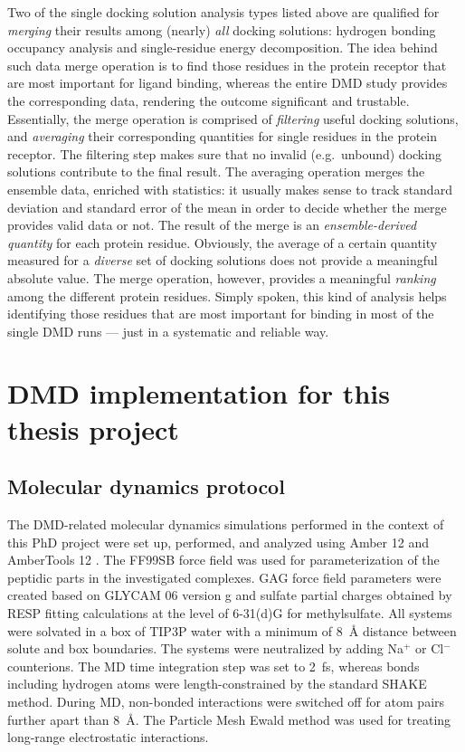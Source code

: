 Two of the single docking solution analysis types listed above are qualified for
\textit{merging} their results among (nearly) \textit{all} docking solutions:
hydrogen bonding occupancy analysis and single-residue energy decomposition. The
idea behind such data merge operation is to find those residues in the protein
receptor that are most important for ligand binding, whereas the entire DMD
study provides the corresponding data, rendering the outcome significant and
trustable. Essentially, the merge operation is comprised of \textit{filtering}
useful docking solutions, and \textit{averaging} their corresponding quantities
for single residues in the protein receptor. The filtering step makes sure that
no invalid (e.g.\ unbound) docking solutions contribute to the final result. The
averaging operation merges the ensemble data, enriched with statistics: it
usually makes sense to track standard deviation and standard error of the mean
in order to decide whether the merge provides valid data or not. The result of
the merge is an \textit{ensemble-derived quantity} for each protein residue.
Obviously, the average of a certain quantity measured for a \textit{diverse} set
of docking solutions does not provide a meaningful absolute value. The merge
operation, however, provides a meaningful \textit{ranking} among the different
protein residues. Simply spoken, this kind of analysis helps identifying those
residues that are most important for binding in most of the single DMD runs ---
just in a systematic and reliable way.


\section{DMD implementation for this thesis project}

\subsection{Molecular dynamics protocol}

The DMD-related molecular dynamics simulations performed in the context of this
PhD project were set up, performed, and analyzed using Amber 12 and AmberTools
12 \cite{case_amber_11}. The FF99SB force field was used for parameterization of
the peptidic parts in the investigated complexes. GAG force field parameters
were created based on GLYCAM 06 version g \cite{kirschner_glycam06:_2008} and
sulfate partial charges obtained by RESP fitting calculations at the level of
6-31(d)G for methylsulfate. All systems were solvated in a box of TIP3P water
with a minimum of \SI{8}{\angstrom} distance between solute and box boundaries.
The systems were neutralized by adding Na$^{+}$ or Cl$^{-}$ counterions. The MD
time integration step was set to \SI{2}{\femto\second}, whereas bonds including
hydrogen atoms were length-constrained by the standard SHAKE method. During MD,
non-bonded interactions were switched off for atom pairs further apart than
\SI{8}{\angstrom}. The Particle Mesh Ewald method was used for treating
long-range electrostatic interactions.


